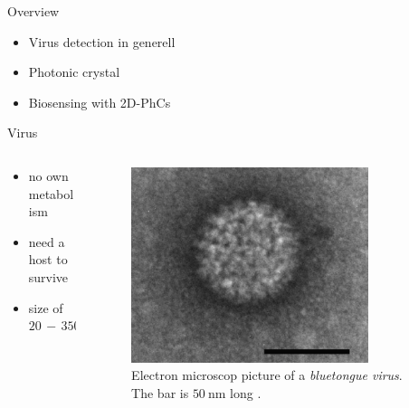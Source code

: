 


\frame{\maketitle}


\begin{frame}{Overview}
\begin{itemize}
  \setlength\itemsep{1.2em}
  \item{Virus detection in generell}
  \item{Photonic crystal}
  \item{Biosensing with 2D-PhCs}
\end{itemize}

\end{frame}

\begin{frame}{Virus}
  \begin{columns}

  \begin{column}{0.49\textwidth}
    \begin{itemize}
      \setlength\itemsep{1.2em}
      \item{no own metabolism}
      \item{need a host to survive} %
      \item{size of $\num{20}\,-\, \num{350}\,\si{\nano\meter}$}
    \end{itemize}
  \end{column}

  \begin{column}{0.49\textwidth}
    \begin{figure}
      \centering
      \includegraphics[width=0.8\textwidth]{./bilder/virus.png}
      \caption{Electron microscop picture of a \emph{bluetongue virus}. The bar is $\SI{50}{\nano\meter}$ long \cite{virus}.}
      \label{fig: 2d_photonic_crystal}
    \end{figure}
  \end{column}

  \end{columns}
\end{frame}

